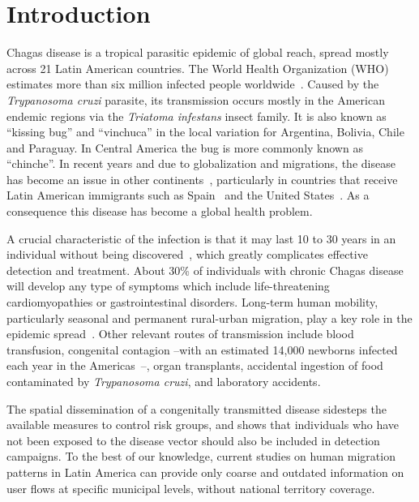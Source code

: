 
\chapter{Introduction}\label{ch:introduction}


Chagas disease is a tropical parasitic epidemic of global reach, spread mostly across 21 Latin American countries. The World Health Organization (WHO) estimates more than six million infected people worldwide~\citep{who2016}. Caused by the \textit{Trypanosoma cruzi} parasite, its transmission occurs mostly in the American endemic regions via the \textit{Triatoma infestans} insect family. It is also known as ``kissing bug'' and ``vinchuca'' in the local variation for Argentina, Bolivia, Chile and Paraguay. In Central America the bug is more commonly known as ``chinche''.
In recent years and due to globalization and migrations, the disease has become an %
issue in other continents~\citep{schmunis2010chagas},
particularly in countries that receive Latin American immigrants such as Spain~\citep{navarro2012chagas} and the United States~\citep{hotez2013unfolding}.
As a consequence this disease has become a global health problem.


A crucial characteristic of the infection is that it may last 10 to 30 years in an individual without being discovered~\citep{rassi2012american}, which greatly complicates effective detection and treatment.
About 30\% of individuals with chronic Chagas disease will develop any type of symptoms which include life-threatening cardiomyopathies or gastrointestinal disorders.
Long-term human mobility, particularly seasonal and permanent rural-urban migration, play a key role in the epidemic spread~\citep{briceno2009chagas}.
Other relevant routes of transmission include blood transfusion, congenital contagion --with an estimated 14,000 newborns infected each year in the Americas~\citep{OPS2006chagas}--, organ transplants, accidental ingestion of food contaminated by \textit{Trypanosoma cruzi}, and laboratory accidents.

The spatial dissemination of a congenitally transmitted disease sidesteps the available measures to control risk groups, and shows that individuals who have not been exposed to the disease vector should also be included in detection campaigns.
To the best of our knowledge, current studies on human migration patterns in Latin America can provide only coarse and outdated information on user flows at specific municipal levels, without national territory coverage.

